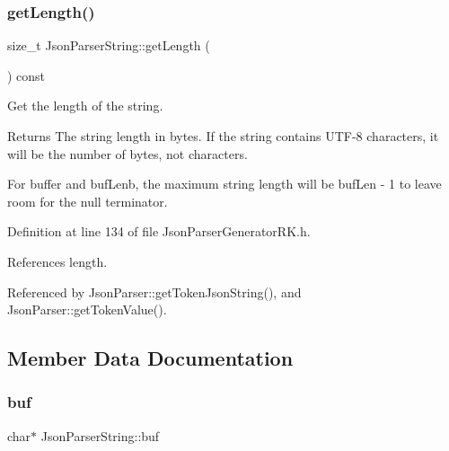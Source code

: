 \mbox{\label{class_json_parser_string_a3a495e1fb69d2900fda8b0556c93e51c}} 
\subsubsection{\texorpdfstring{get\+Length()}{getLength()}}
{\footnotesize\ttfamily size\+\_\+t Json\+Parser\+String\+::get\+Length (\begin{DoxyParamCaption}{ }\end{DoxyParamCaption}) const\hspace{0.3cm}{\ttfamily [inline]}}



Get the length of the string. 

\begin{DoxyReturn}{Returns}
The string length in bytes. If the string contains U\+T\+F-\/8 characters, it will be the number of bytes, not characters.
\end{DoxyReturn}
For buffer and buf\+Lenb, the maximum string length will be buf\+Len -\/ 1 to leave room for the null terminator. 

Definition at line 134 of file Json\+Parser\+Generator\+R\+K.\+h.



References length.



Referenced by Json\+Parser\+::get\+Token\+Json\+String(), and Json\+Parser\+::get\+Token\+Value().



\subsection{Member Data Documentation}
\mbox{\label{class_json_parser_string_a3ffd87df1aff38ff4142fad32e1e3de0}} 
\subsubsection{\texorpdfstring{buf}{buf}}
{\footnotesize\ttfamily char$\ast$ Json\+Parser\+String\+::buf\hspace{0.3cm}{\ttfamily [protected]}}



